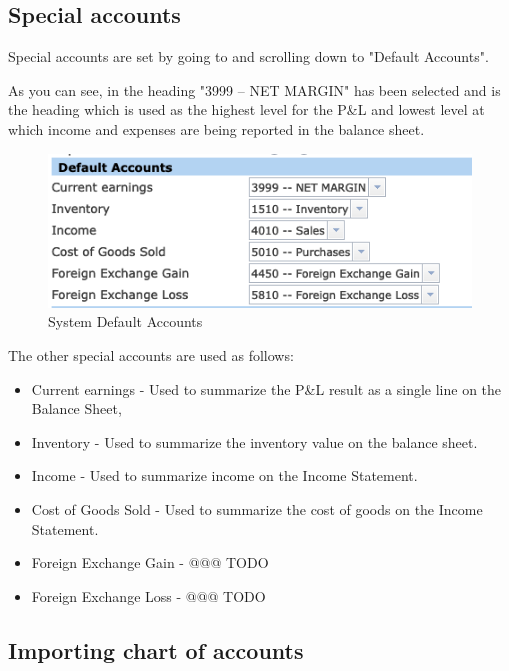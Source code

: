 \subsection{Special accounts}
\label{subsec-company-config-coa-special-accounts}

Special accounts are set by going to  and scrolling down to "Default Accounts".

As you can see, in  the heading "3999 -- NET MARGIN" has been selected and is the heading which is used as the highest level for the P\&L and lowest level at which income and expenses are being reported in the balance sheet.

\begin{figure}[H]
    \centering
    \includegraphics[width=\graphicswidth]{images/system-default-accounts.png}
    \caption{System Default Accounts}
    \label{fig:system-default-accounts}
\end{figure}

The other special accounts are used as follows:

\begin{itemize}
    \item Current earnings - Used to summarize the P\&L result as a single line on the Balance Sheet,
    \item Inventory - Used to summarize the inventory value on the balance sheet.
    \item Income - Used to summarize income on the Income Statement.
    \item Cost of Goods Sold - Used to summarize the cost of goods on the Income Statement.
    \item Foreign Exchange Gain - @@@ TODO
    \item Foreign Exchange Loss - @@@ TODO
\end{itemize}

\subsection{Importing chart of accounts}
\label{subsec-coa-importing}

